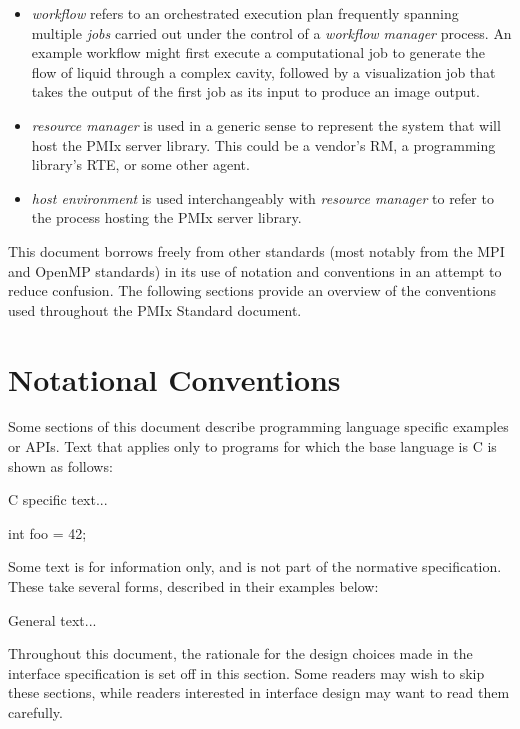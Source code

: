\begin{itemize}
\item {}\emph{workflow} refers to an orchestrated execution plan frequently spanning multiple \emph{jobs} carried out under the control of a \emph{workflow manager} process. An example workflow might first execute a computational job to generate the flow of liquid through a complex cavity, followed by a visualization job that takes the output of the first job as its input to produce an image output.
\item {}\emph{resource manager} is used in a generic sense to represent the system that will host the \ac{PMIx} server library. This could be a vendor's \ac{RM}, a programming library's \ac{RTE}, or some other agent.
\item {}\emph{host environment} is used interchangeably with \emph{resource manager} to refer to the process hosting the \ac{PMIx} server library.
\end{itemize}


This document borrows freely from other standards (most notably from the \ac{MPI} and OpenMP standards) in its use of notation and conventions in an attempt to reduce confusion. The following sections provide an overview of the conventions used throughout the \ac{PMIx} Standard document.

\section{Notational Conventions}

Some sections of this document describe programming language specific examples or \acp{API}.
Text that applies only to programs for which the base language is C is shown as follows:

\cspecificstart
C specific text...
\begin{codepar}
int foo = 42;
\end{codepar}
\cspecificend

Some text is for information only, and is not part of the normative specification.
These take several forms, described in their examples below:

\notestart
\noteheader
General text...
\noteend

\rationalestart
Throughout this document, the rationale for the design choices made in the interface specification is set off in this section.
Some readers may wish to skip these sections, while readers interested in interface design may want to read them carefully.
\rationaleend

